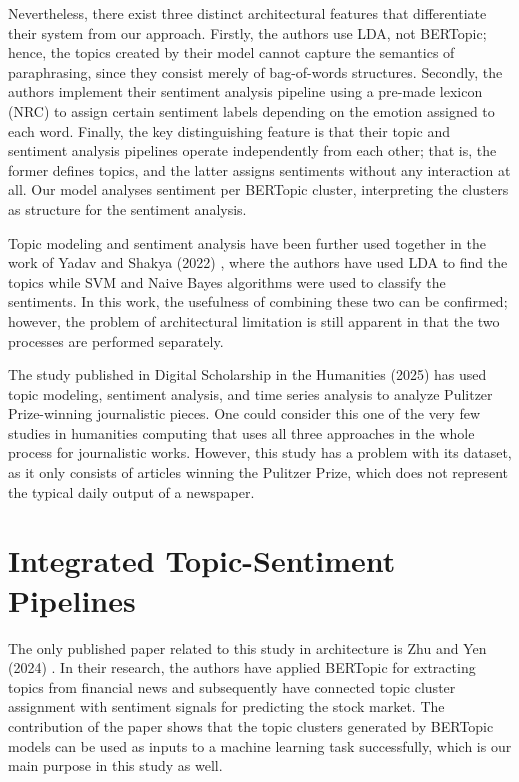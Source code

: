 Nevertheless, there exist three distinct architectural features that differentiate their system from our approach. Firstly, the authors use LDA, not BERTopic; hence, the topics created by their model cannot capture the semantics of paraphrasing, since they consist merely of bag-of-words structures. Secondly, the authors implement their sentiment analysis pipeline using a pre-made lexicon (NRC) to assign certain sentiment labels depending on the emotion assigned to each word. Finally, the key distinguishing feature is that their topic and sentiment analysis pipelines operate independently from each other; that is, the former defines topics, and the latter assigns sentiments without any interaction at all. Our model analyses sentiment per BERTopic cluster, interpreting the clusters as structure for the sentiment analysis.

Topic modeling and sentiment analysis have been further used together in the work of Yadav and Shakya (2022) \cite{yadav2022}, where the authors have used LDA to find the topics while SVM and Naive Bayes algorithms were used to classify the sentiments. In this work, the usefulness of combining these two can be confirmed; however, the problem of architectural limitation is still apparent in that the two processes are performed separately.

The study published in Digital Scholarship in the Humanities (2025) \cite{dsh2025} has used topic modeling, sentiment analysis, and time series analysis to analyze Pulitzer Prize-winning journalistic pieces. One could consider this one of the very few studies in humanities computing that uses all three approaches in the whole process for journalistic works. However, this study has a problem with its dataset, as it only consists of articles winning the Pulitzer Prize, which does not represent the typical daily output of a newspaper.

\section{Integrated Topic-Sentiment Pipelines}

The only published paper related to this study in architecture is Zhu and Yen (2024) \cite{zhu2024}. In their research, the authors have applied BERTopic for extracting topics from financial news and subsequently have connected topic cluster assignment with sentiment signals for predicting the stock market. The contribution of the paper shows that the topic clusters generated by BERTopic models can be used as inputs to a machine learning task successfully, which is our main purpose in this study as well.

